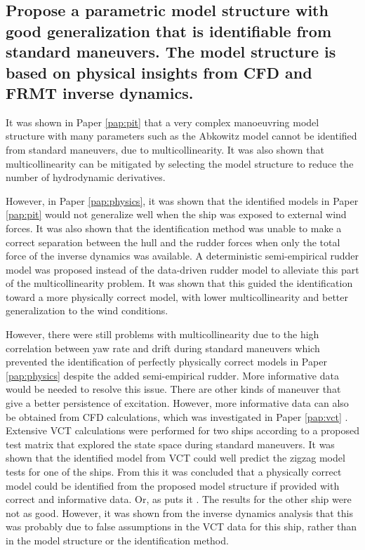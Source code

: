 \subsection*{Propose a parametric model structure with good generalization that is identifiable from standard maneuvers. The model structure is based on physical insights from CFD and FRMT inverse dynamics.}
It was shown in Paper \ref{pap:pit}  that a very complex manoeuvring model structure with many parameters such as the Abkowitz model cannot be identified from standard maneuvers, due to multicollinearity.  
It was also shown that multicollinearity can be mitigated by selecting the model structure to reduce the number of hydrodynamic derivatives.

However, in Paper \ref{pap:physics}, it was shown that the identified models in Paper \ref{pap:pit} would not generalize well when the ship was exposed to external wind forces. 
It was also shown that the identification method was unable to make a correct separation between the hull and the rudder forces when only the total force of the inverse dynamics was available. 
A deterministic semi-empirical rudder model was proposed instead of the data-driven rudder model to alleviate this part of the multicollinearity problem. It was shown that this guided the identification toward a more physically correct model, with lower multicollinearity and better generalization to the wind conditions. 

However, there were still problems with multicollinearity due to the high correlation between yaw rate and drift during standard maneuvers which prevented the identification of perfectly physically correct models in Paper \ref{pap:physics} despite the added semi-empirical rudder. More informative data would be needed to resolve this issue. There are other kinds of maneuver that give a better persistence of excitation. However, more informative data can also be obtained from CFD calculations, which was investigated in Paper \ref{pap:vct} . Extensive VCT calculations were performed for two ships according to a proposed test matrix that explored the state space during standard maneuvers.
It was shown that the identified model from VCT could well predict the zigzag model tests for one of the ships. From this it was concluded that a physically correct model could be identified from the proposed model structure if provided with correct and informative data. Or, as \textcite{revestidoherreroTwostepIdentificationNonlinear2012} puts it .
The results for the other ship were not as good.  However, it was shown from the inverse dynamics analysis that this was probably due to false assumptions in the VCT data for this ship, rather than in the model structure or the identification method.  

